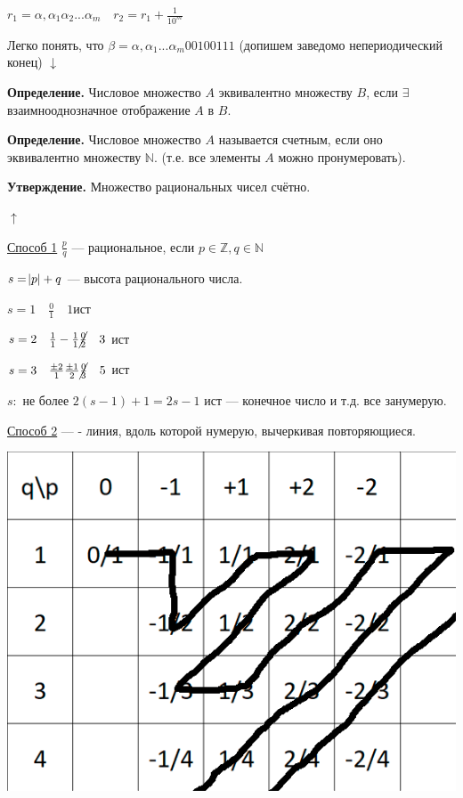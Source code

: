 \documentclass{article}
\begin{document}
        $r_1 = \alpha,\alpha_1\alpha_2...\alpha_m \quad r_2 = r_1 + \frac{1}{10^m}$

        Легко понять, что $\beta = \alpha,\alpha_1...\alpha_m00100111$ (допишем заведомо непериодический конец) $\downarrow$

        \textbf{Определение.} Числовое множество $A$ эквивалентно множеству $B$, если $\exists$ взаимнооднозначное отображение $A$ в $B$.

        \textbf{Определение.} Числовое множество $A$ называется счетным, если оно эквивалентно множеству $\mathbb{N}$. (т.е. все элементы $A$ можно пронумеровать).

        \textbf{Утверждение.} Множество рациональных чисел счётно. 

        $\uparrow$

        \underline{Способ 1} $\frac{p}{q}$ --- рациональное, если $p \in \mathbb{Z}, q \in \mathbb{N}$

        $s = \abs{p} + q$ --- высота рационального числа.

        $s = 1 \quad \frac{0}{1} \quad 1 $ист

        $s = 2 \quad \frac{1}{1} - \frac{1}{1} \cancel{\frac{0}{2}} \quad 3$ ист

        $s = 3 \quad \frac{\pm 2}{1} \frac{\pm 1}{2} \cancel{\frac{0}{3}} \quad 5$ ист

        $s:$ не более $2(s - 1) + 1 = 2s - 1$ ист --- конечное число и т.д. все занумерую.

        \underline{Способ 2} 
        --- - линия, вдоль которой нумерую, вычеркивая повторяющиеся.

        \includegraphics[scale=0.4]{d_ch_8_1}
\end{document}

